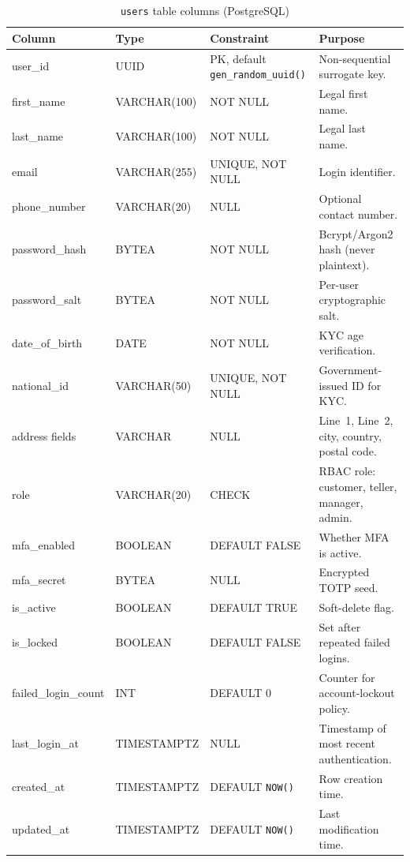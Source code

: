 \begin{table}[htbp]
  \centering
  \caption{\texttt{users} table columns (PostgreSQL)}
  \label{tab:users}
  \small
  \setlength{\tabcolsep}{4pt}
  \renewcommand{\arraystretch}{1.15}
  \begin{tabularx}{\textwidth}{@{} l l l X @{}}
    \toprule
    \textbf{Column} & \textbf{Type} & \textbf{Constraint} & \textbf{Purpose} \\
    \midrule
    user\_id            & UUID & PK, default \texttt{gen\_random\_uuid()} & Non-sequential surrogate key. \\
    first\_name         & VARCHAR(100) & NOT NULL     & Legal first name. \\
    last\_name          & VARCHAR(100) & NOT NULL     & Legal last name. \\
    email               & VARCHAR(255) & UNIQUE, NOT NULL & Login identifier. \\
    phone\_number       & VARCHAR(20)  & NULL         & Optional contact number. \\
    password\_hash      & BYTEA        & NOT NULL     & Bcrypt/Argon2 hash (never plaintext). \\
    password\_salt      & BYTEA        & NOT NULL     & Per-user cryptographic salt. \\
    date\_of\_birth     & DATE         & NOT NULL     & KYC age verification. \\
    national\_id        & VARCHAR(50)  & UNIQUE, NOT NULL & Government-issued ID for KYC. \\
    address fields      & VARCHAR      & NULL         & Line~1, Line~2, city, country, postal code. \\
    role                & VARCHAR(20)  & CHECK        & RBAC role: customer, teller, manager, admin. \\
    mfa\_enabled        & BOOLEAN      & DEFAULT FALSE & Whether MFA is active. \\
    mfa\_secret         & BYTEA        & NULL         & Encrypted TOTP seed. \\
    is\_active          & BOOLEAN      & DEFAULT TRUE & Soft-delete flag. \\
    is\_locked          & BOOLEAN      & DEFAULT FALSE & Set after repeated failed logins. \\
    failed\_login\_count& INT          & DEFAULT 0    & Counter for account-lockout policy. \\
    last\_login\_at     & TIMESTAMPTZ  & NULL         & Timestamp of most recent authentication. \\
    created\_at         & TIMESTAMPTZ  & DEFAULT \texttt{NOW()} & Row creation time. \\
    updated\_at         & TIMESTAMPTZ  & DEFAULT \texttt{NOW()} & Last modification time. \\
    \bottomrule
  \end{tabularx}
\end{table}

